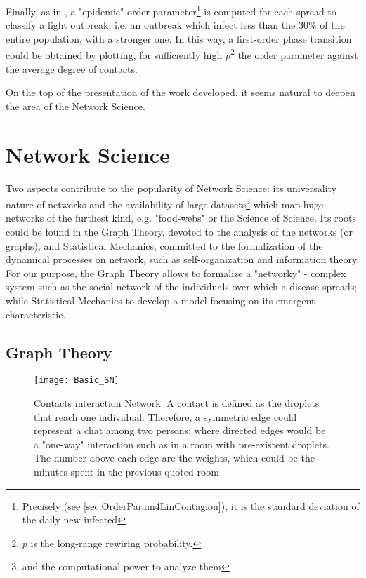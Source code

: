 \documentclass[a4paper,10pt,twoside]{book} %
\theoremstyle{definition}
\begin{document}
Finally, as in \cite{Thurner::NetBasedExpl}, a "epidemic" order parameter\footnote{Precisely (see \autoref{sec:OrderParam4LinContagion}), it is the standard deviation of the daily new infected} is computed for each spread to classify a light outbreak, i.e. an outbreak which infect less than the $30\%$ of the entire population, with a stronger one. In this way, a first-order phase transition could be obtained by plotting, for sufficiently high $p$\footnote{$p$ is the long-range rewiring probability.} the order parameter against the average degree of contacts.

On the top of the presentation of the work developed, it seems natural to deepen the area of the Network Science.


\section{Network Science}

Two aspects contribute to the popularity of Network Science: its universality nature of networks and the availability of large datasets\footnote{and the computational power to analyze them} which map huge networks of the furthest kind, e.g. "food-webs" or the Science of Science.
Its roots could be found in the Graph Theory, devoted to the analysis of the networks (or graphs), and Statistical Mechanics, committed to the formalization of the dynamical processes on network, such as self-organization and information theory.
For our purpose, the Graph Theory allows to formalize a "networky" - complex system such as the social network of the individuals over which a disease spreads; while Statistical Mechanics to develop a model focusing on its emergent characteristic.

\subsection{Graph Theory}
\label{sec:GraphTheory}
\begin{figure}[htbp]
	\centering
	\texttt{[image: Basic\_SN]}
	\caption{Contacts interaction Network. A contact is defined as the droplets that reach one individual. Therefore, a symmetric edge could represent a chat among two persons; where directed edges would be a "one-way" interaction such as in a room with pre-existent droplets. The number above each edge are the weights, which could be the minutes spent in the previous quoted room}
	\label{fig:basicSN}
\end{figure}
\end{document}
